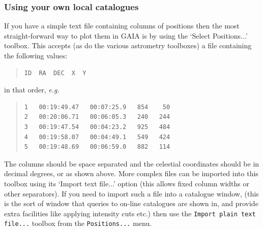 \documentclass[twoside,11pt]{article}
\renewcommand{\_}{\texttt{\symbol{95}}}
\newcommand{\mytt}[1]{{\texttt{#1}}}
\begin{document}
\subsubsection{Using your own local catalogues}
If you have a simple text file containing columns of positions then
the most straight-forward way to plot them in GAIA is by using the
`Select Positions...' toolbox. This accepts (as do the various
astrometry toolboxes) a file containing the following values:
\begin{quote}
\begin{verbatim}
ID  RA  DEC  X  Y
\end{verbatim}
\end{quote}
in that order, \textit{e.g.}
\begin{quote}
\begin{verbatim}
1   00:19:49.47   00:07:25.9   854    50
2   00:20:06.71   00:06:05.3   240   244
3   00:19:47.54   00:04:23.2   925   484
4   00:19:58.07   00:04:49.1   549   424
5   00:19:48.69   00:06:59.0   882   114
\end{verbatim}
\end{quote}
The columns should be space separated and the celestial coordinates
should be in decimal degrees, or as shown above. More complex files
can be imported into this toolbox using its `Import text file...'
option (this allows fixed column widths or other separators). If you
need to import such a file into a catalogue window, (this is the sort
of window that queries to on-line catalogues are shown in, and provide
extra facilities like applying intensity cuts etc.) then use the
\mytt{Import plain text file...} toolbox from the \mytt{Positions...} menu.
\end{document}
